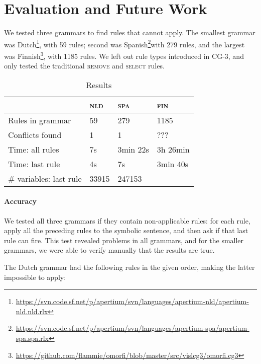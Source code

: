 \section{Evaluation and Future Work}
\label{sec:eval}

We tested three grammars to find rules that cannot apply. The smallest grammar was Dutch\footnote{\url{https://svn.code.sf.net/p/apertium/svn/languages/apertium-nld/apertium-nld.nld.rlx}}, with 59 rules; second was Spanish\footnote{\url{https://svn.code.sf.net/p/apertium/svn/languages/apertium-spa/apertium-spa.spa.rlx}}with 279 rules, and the largest was Finnish\footnote{\url{https://github.com/flammie/omorfi/blob/master/src/vislcg3/omorfi.cg3}}, with 1185 rules. We left out rule types introduced in CG-3, and only tested the traditional \textsc{remove} and \textsc{select} rules.

\begin{table}[]
\centering
\begin{tabular}{|l|l|l|l|}
\hline
                      & \textsc{nld}  & \textsc{spa}  & \textsc{fin}  \\ \hline
Rules in grammar      & 59              & 279               & 1185     \\ \hline
Conflicts found       & 1               & 1                 & ???    \\ \hline
Time: all rules       & 7s              & 3min 22s          & 3h 26min    \\ \hline
Time: last rule       & 4s              & 7s                & 3min 40s    \\ \hline
\# variables: last rule & 33915         & 247153            &    \\ \hline
\end{tabular}
\caption{Results}
\label{table:res}
\end{table}

\paragraph{Accuracy} We tested all three grammars if they contain non-applicable rules:
for each rule, apply all the preceding rules to the symbolic sentence, and then ask if that last rule can fire.
This test revealed problems in all grammars, and for the smaller grammars, we were able to verify manually that the results are true.

The Dutch grammar had the following rules in the given order, making the latter impossible to apply:

